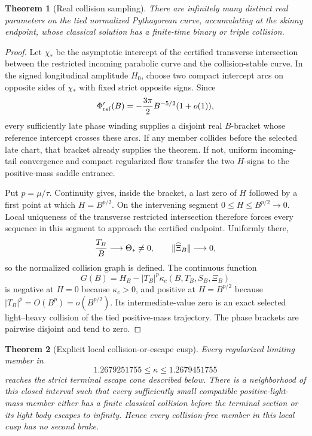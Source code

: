 \documentclass[11pt]{article}
\newtheorem{theorem}{Theorem}
\begin{document}
\begin{theorem}[Real collision sampling]
There are infinitely many distinct real parameters on the tied normalized
Pythagorean curve, accumulating at the skinny endpoint, whose classical
solution has a finite-time binary or triple collision.
\end{theorem}

\begin{proof}
Let $\chi_*$ be the asymptotic intercept of the certified transverse
intersection between the restricted incoming parabolic curve and the
collision-stable curve.  In the signed longitudinal amplitude $H_0$, choose
two compact intercept arcs on opposite sides of $\chi_*$ with fixed strict
opposite signs.  Since
\[
 \Phi_{\rm ref}'(B)=-{3\pi\over2}B^{-5/2}(1+o(1)),
\]
every sufficiently late phase winding supplies a disjoint real $B$-bracket
whose reference intercept crosses these arcs.  If any member collides before
the selected late chart, that bracket already supplies the theorem.  If not,
uniform incoming-tail convergence and compact regularized flow transfer the
two $H$-signs to the positive-mass saddle entrance.

Put $p=\mu/\tau$.  Continuity gives, inside the bracket, a last zero of $H$
followed by a first point at which $H=B^{p/2}$.  On the intervening segment
$0\le H\le B^{p/2}\to0$.  Local uniqueness of the transverse restricted
intersection therefore forces every sequence in this segment to approach the
certified endpoint.  Uniformly there,
\[
 {T_B\over B}\longrightarrow\Theta_*\ne0,\qquad
 \|\widehat\Xi_B\|\longrightarrow0,
\]
so the normalized collision graph is defined.  The continuous function
\[
 G(B)=H_B-|T_B|^p\kappa_c(B,T_B,S_B,\Xi_B)
\]
is negative at $H=0$ because $\kappa_c>0$, and positive at
$H=B^{p/2}$ because $|T_B|^p=O(B^p)=o(B^{p/2})$.  Its intermediate-value
zero is an exact selected light--heavy collision of the tied positive-mass
trajectory.  The phase brackets are pairwise disjoint and tend to zero.
\end{proof}

\begin{theorem}[Explicit local collision-or-escape cusp]
Every regularized limiting member in
\[
 1.2679251755\le\kappa\le1.2679451755
\]
reaches the strict terminal escape cone described below.  There is a
neighborhood of this closed interval such that every sufficiently small
compatible positive-light-mass member either has a finite classical collision
before the terminal section or its light body escapes to infinity.  Hence
every collision-free member in this local cusp has no second brake.
\end{theorem}
\end{document}

